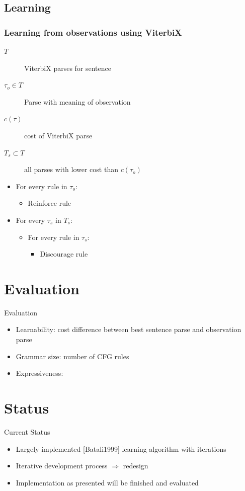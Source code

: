 \documentclass[11pt,a4paper,xcolor=dvipsnames]{beamer}
\begin{document}
\subsection{Learning}
\begin{frame} %
\frametitle{Learning from observations using ViterbiX}
\begin{description}
  \item[$T$] ViterbiX parses for sentence
  \item[$\tau_o \in T$] Parse with meaning of observation
  \item[$c(\tau)$] cost of ViterbiX parse
  \item[$T_s \subset T$] all parses with lower cost than $c(\tau_o)$
\end{description}

\begin{itemize}
\item For every rule in $\tau_o$:
    \begin{itemize}
      \item Reinforce rule
    \end{itemize}
  \item For every $\tau_s$ in $T_s$:
    \begin{itemize}
      \item For every rule in $\tau_s$:
        \begin{itemize}
          \item Discourage rule
        \end{itemize}
    \end{itemize}
\end{itemize}
\end{frame}

\section{Evaluation}
\begin{frame}{Evaluation} %
\begin{itemize}
  \item Learnability: cost difference between best sentence parse and observation parse
  \item Grammar size: number of CFG rules
  \item Expressiveness: 
\end{itemize}
\end{frame}

\section{Status} %
\begin{frame}{Current Status}
  \begin{itemize}
    \item Largely implemented [Batali1999] learning algorithm with iterations
    \item Iterative development process $\Rightarrow$ redesign
    \item Implementation as presented will be finished and evaluated
  \end{itemize}
\end{frame}
\end{document}
